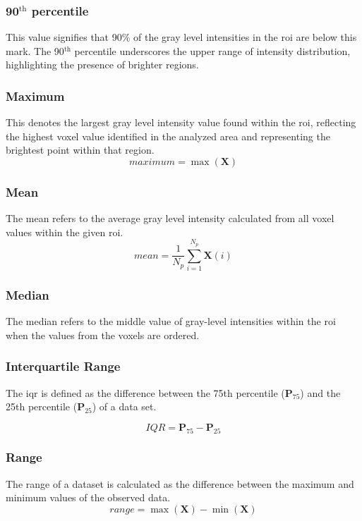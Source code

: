 \subsubsection*{90$^{\text{th}}$ percentile}
This value signifies that 90\% of the gray level intensities in the \ac{roi} are below this mark.
The 90$^{\text{th}}$ percentile underscores the upper range of intensity distribution, highlighting the presence of brighter regions.  

\subsubsection*{Maximum}
 This denotes the largest gray level intensity value found within the \ac{roi}, reflecting the highest voxel value identified in the analyzed area and representing the brightest point within that region.  
\begin{equation}
    \textit{maximum} = \max(\textbf{X})
\end{equation}

\subsubsection*{Mean}
The mean refers to the average gray level intensity calculated from all voxel values within the given \ac{roi}.
\begin{equation}
    \textit{mean} = \frac{1}{N_p}\displaystyle\sum^{N_p}_{i=1}{\textbf{X}(i)}
\end{equation}

\subsubsection*{Median}
The median refers to the middle value of gray-level intensities within the \ac{roi} when the values from the voxels are ordered. 

\subsubsection*{Interquartile Range}
The \acf{iqr} is defined as the difference between the 75th percentile ($\mathbf{P}_{75}$) and the 25th percentile  ($\mathbf{P}_{25}$) of a data set. 

\begin{equation}
    \textit{IQR} = \textbf{P}_{75} - \textbf{P}_{25}
\end{equation}



\subsubsection*{Range}
The range of a dataset is calculated as the difference between the maximum and minimum values of the observed data.
\begin{equation}
    \textit{range} = \max(\textbf{X}) - \min(\textbf{X})
\end{equation}

